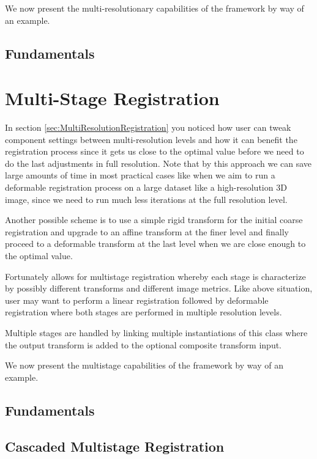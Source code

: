We now present the multi-resolutionary capabilities of the framework by
way of an example.

\subsection{Fundamentals}
\ifitkFullVersion

\fi

\section{Multi-Stage Registration}
\label{sec:MultiStageRegistration}
In section \ref{sec:MultiResolutionRegistration} you noticed how user can tweak
component settings between multi-resolution levels and how it can benefit the
registration process since it gets us close to the optimal value before we need
to do the last adjustments in full resolution.
Note that by this approach we can save large amounts of time in most practical
cases like when we aim to run a deformable registration process on a large dataset
like a high-resolution 3D image, since we need to run much less iterations at the
full resolution level.

Another possible scheme is to use a simple rigid transform for the initial coarse
registration and upgrade to an affine transform at the finer level and finally
proceed to a deformable transform at the last level when we are close enough to
the optimal value.

Fortunately  allows for multistage registration
whereby each stage is characterize by possibly different transforms and different
image metrics. Like above situation, user may want to perform a linear registration
followed by deformable registration where both stages are performed in multiple
resolution levels.

Multiple stages are handled by linking multiple instantiations of this class where
the output transform is added to the optional composite transform input.

We now present the multistage capabilities of the framework by way of an example.

\subsection{Fundamentals}
\ifitkFullVersion

\fi

\subsection{Cascaded Multistage Registration}
\ifitkFullVersion

\fi

